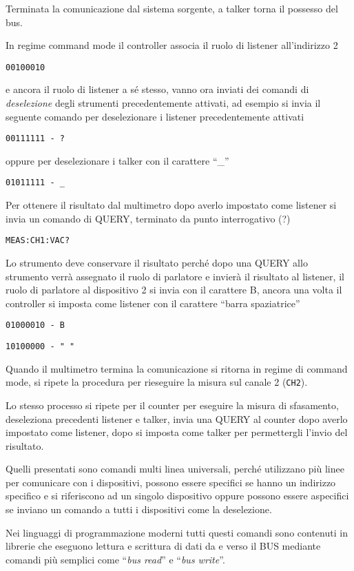 Terminata la comunicazione dal sistema sorgente, a talker torna il possesso del
bus.

In regime command mode il controller associa il ruolo di listener
all'indirizzo 2

\verb|00100010|

e ancora il ruolo di listener a sé stesso, vanno ora inviati dei comandi di
\textit{deselezione} degli strumenti precedentemente attivati, ad esempio si
invia il seguente comando per deselezionare i listener precedentemente attivati

\verb|00111111 - ?|

oppure per deselezionare i talker con il carattere ``\_''

\verb|01011111 - _|

Per ottenere il risultato dal multimetro dopo averlo impostato come listener si
invia un comando di QUERY, terminato da punto interrogativo (?)

\verb|MEAS:CH1:VAC?|

Lo strumento deve conservare il risultato perché dopo una QUERY allo strumento
verrà assegnato il ruolo di parlatore e invierà il risultato al listener, il
ruolo di parlatore al dispositivo 2 si invia con il carattere B, ancora una
volta il controller si imposta come listener con il carattere ``barra
spaziatrice''

\verb|01000010 - B|

\verb|10100000 - " "|

Quando il multimetro termina la comunicazione si ritorna in regime di command
mode, si ripete la procedura per rieseguire la misura sul canale 2 (\verb|CH2|).

Lo stesso processo si ripete per il counter per eseguire la misura di
sfasamento, deseleziona precedenti listener e talker, invia una QUERY al
counter dopo averlo impostato come listener, dopo si imposta come talker per
permettergli l'invio del risultato.



Quelli presentati sono comandi multi linea universali, perché utilizzano più
linee per comunicare con i dispositivi, possono essere specifici se hanno un
indirizzo specifico e si riferiscono ad un singolo dispositivo oppure possono
essere aspecifici se inviano un comando a tutti i dispositivi come la
deselezione.

Nei linguaggi di programmazione moderni tutti questi comandi sono contenuti in
librerie che eseguono lettura e scrittura di dati da e verso il BUS mediante
comandi più semplici come ``\textit{bus read}'' e ``\textit{bus write}''.

